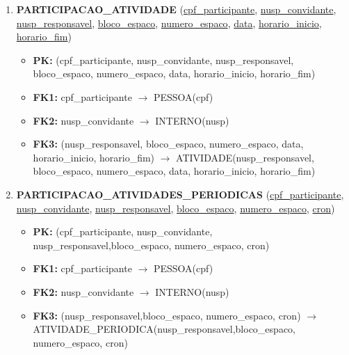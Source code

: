 \documentclass{article}
\begin{document}
\begin{enumerate}
    \item \textbf{PARTICIPACAO\_ATIVIDADE} (\underline{cpf\_participante}, \underline{nusp\_convidante}, \underline{nusp\_responsavel}, \underline{bloco\_espaco}, \underline{numero\_espaco}, \underline{data}, \underline{horario\_inicio}, \underline{horario\_fim})
        \begin{itemize}
            \item \textbf{PK:} (cpf\_participante, nusp\_convidante, nusp\_responsavel, bloco\_espaco, numero\_espaco, data, horario\_inicio, horario\_fim)
            \item \textbf{FK1:} cpf\_participante $\rightarrow$ PESSOA(cpf)
            \item \textbf{FK2:} nusp\_convidante $\rightarrow$ INTERNO(nusp)
            \item \textbf{FK3:} (nusp\_responsavel, bloco\_espaco, numero\_espaco, data, horario\_inicio, horario\_fim) $\rightarrow$ ATIVIDADE(nusp\_responsavel, bloco\_espaco, numero\_espaco, data, horario\_inicio, horario\_fim)
        \end{itemize}

    \item \textbf{PARTICIPACAO\_ATIVIDADES\_PERIODICAS} (\underline{cpf\_participante}, \underline{nusp\_convidante}, \underline{nusp\_responsavel}, \underline{bloco\_espaco}, \underline{numero\_espaco}, \underline{cron})
        \begin{itemize}
            \item \textbf{PK:} (cpf\_participante, nusp\_convidante, nusp\_responsavel,bloco\_espaco, numero\_espaco, cron)
            \item \textbf{FK1:} cpf\_participante $\rightarrow$ PESSOA(cpf)
            \item \textbf{FK2:} nusp\_convidante $\rightarrow$ INTERNO(nusp)
            \item \textbf{FK3:} (nusp\_responsavel,bloco\_espaco, numero\_espaco, cron) $\rightarrow$ ATIVIDADE\_PERIODICA(nusp\_responsavel,bloco\_espaco, numero\_espaco, cron)
        \end{itemize}


\end{enumerate}
\end{document}
